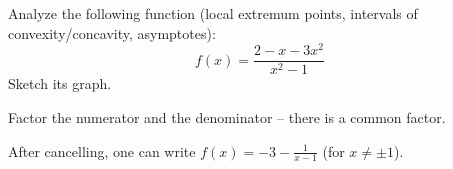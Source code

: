 
\begin{question}
Analyze the following function (local extremum points, intervals of convexity/concavity, asymptotes):
\[ f(x)=\frac{2-x-3x^2}{x^2-1} \]
Sketch its graph.
\end{question}

\begin{hint}
Factor the numerator and the denominator -- there is a common factor.
\end{hint}

\begin{hint}
After cancelling, one can write $f(x)=-3-\frac{1}{x-1}$ (for $x\neq\pm1$).
\end{hint}

